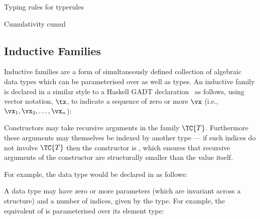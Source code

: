 {Typing rules for \TT{}}
{typerules}

{Cumulativity}
{cumul}

\subsection{Inductive Families}

\label{sect:inductivefams}

Inductive families \cite{dybjer1994inductive} are a form of simultaneously
defined collection of algebraic data types which can be parameterised over
 as well as types.  An inductive family is declared 
in a similar style to a Haskell GADT declaration~\cite{pj2006gadts}
as
follows, using vector notation, $\tx$, to indicate a
sequence of zero or more $\vx$ (i.e., $\vx_1,\vx_2,\ldots,\vx_n$):


Constructors may take recursive arguments in the family
$\TC{T}$. Furthermore these arguments may themselves be indexed by another type ---
if such indices do not involve $\TC{T}$ then the constructor is
, which ensures that recursive arguments of the
constructor are structurally smaller than the value itself.

For example, the \Idris{} data type  would be declared in \TT{} as follows:

\DM{
\Data\hg\Nat\Hab\Type\hg\Where\hg\Z\Hab\Nat\:\mid\:\suc\Hab\fbind{\vk}{\Nat}{\Nat}
}

A data type may have zero or more parameters (which are invariant
across a structure) and a number of indices, given by the type. For
example, the \TT{} equivalent of  is parameterised over its element type:

\DM{
\AR{
\Data\hg\List\:(\va\Hab\Type)\Hab\Type\hg\Where
\ARd{
& \nil\Hab\List\:\va\\
\mid & (\cons)\Hab\fbind{\vx}{\va}{\fbind{\vxs}{\List\:\va}{\List\:\va}}
}
}
}

